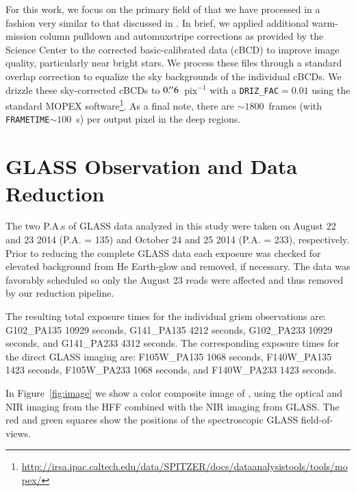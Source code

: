 For this work, we focus on the primary field of \cler that we have processed in a fashion very similar to that
discussed in \citet{2014ApJ...785..108B,2014ApJ...786L...4R,2015arXiv150402099H}.  In brief, we applied
additional warm-mission column pulldown and automuxstripe corrections as provided by the \spitzer Science Center
to the corrected basic-calibrated data (cBCD) to improve image quality, particularly near bright stars.  We
process these files through a standard overlap correction to equalize the sky backgrounds of the individual
cBCDs.  We drizzle these sky-corrected cBCDs to $0\mbox{$.\!^{\prime\prime}$}6$~pix$^{-1}$ with a \texttt{DRIZ\_FAC}$=\!0.01$ using
the standard MOPEX
software\footnote{\url{http://irsa.ipac.caltech.edu/data/SPITZER/docs/dataanalysistools/tools/mopex/}}.  As a
final note, there are $\sim\!1800$~frames (with \texttt{FRAMETIME}$\sim\!100$~s) per output pixel in the deep
regions.


\section{GLASS Observation and Data Reduction}
\label{sec:datareduction}

The two P.A.s of GLASS data analyzed in this study were 
taken on August 22 and 23 2014 (P.A. = 135) %
and October 24 and 25 2014 (P.A. = 233), respectively. %
Prior to reducing the complete GLASS data each exposure was checked for elevated background from He Earth-glow 
\citep{Brammer:2014p34990} and removed, if necessary. The \cler data was favorably scheduled so only the August 23 reads were 
affected and thus removed by our reduction pipeline.

The resulting total exposure times for the individual grism observations are: G102\_PA135 10929 seconds,
G141\_PA135 4212 seconds,
G102\_PA233 10929 seconds, and
G141\_PA233 4312 seconds.
The corresponding exposure times for the direct GLASS imaging are:
F105W\_PA135 1068 seconds,
F140W\_PA135 1423 seconds,
F105W\_PA233 1068 seconds, and
F140W\_PA233 1423 seconds.

In Figure~\ref{fig:image} we show a color composite image of \cler,
using the optical and NIR imaging from the HFF combined with the NIR imaging from GLASS.
The red and green squares show the positions of the spectroscopic GLASS \cler field-of-views.

